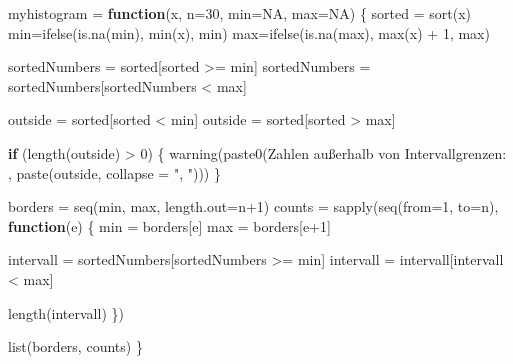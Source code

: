 \documentclass[
]{article}
\newenvironment{Shaded}{\begin{snugshade}}{\end{snugshade}}
\newcommand{\AttributeTok}[1]{\textcolor[rgb]{0.77,0.63,0.00}{#1}}
\newcommand{\ConstantTok}[1]{\textcolor[rgb]{0.00,0.00,0.00}{#1}}
\newcommand{\ControlFlowTok}[1]{\textcolor[rgb]{0.13,0.29,0.53}{\textbf{#1}}}
\newcommand{\DecValTok}[1]{\textcolor[rgb]{0.00,0.00,0.81}{#1}}
\newcommand{\FunctionTok}[1]{\textcolor[rgb]{0.00,0.00,0.00}{#1}}
\newcommand{\NormalTok}[1]{#1}
\newcommand{\OtherTok}[1]{\textcolor[rgb]{0.56,0.35,0.01}{#1}}
\newcommand{\SpecialCharTok}[1]{\textcolor[rgb]{0.00,0.00,0.00}{#1}}
\newcommand{\StringTok}[1]{\textcolor[rgb]{0.31,0.60,0.02}{#1}}
\begin{document}
\begin{Shaded}
\begin{Highlighting}[]
\NormalTok{myhistogram }\OtherTok{=} \ControlFlowTok{function}\NormalTok{(x, }\AttributeTok{n=}\DecValTok{30}\NormalTok{, }\AttributeTok{min=}\ConstantTok{NA}\NormalTok{, }\AttributeTok{max=}\ConstantTok{NA}\NormalTok{) \{}
\NormalTok{    sorted }\OtherTok{=} \FunctionTok{sort}\NormalTok{(x)}
\NormalTok{    min}\OtherTok{=}\FunctionTok{ifelse}\NormalTok{(}\FunctionTok{is.na}\NormalTok{(min), }\FunctionTok{min}\NormalTok{(x), min)}
\NormalTok{    max}\OtherTok{=}\FunctionTok{ifelse}\NormalTok{(}\FunctionTok{is.na}\NormalTok{(max), }\FunctionTok{max}\NormalTok{(x) }\SpecialCharTok{+} \DecValTok{1}\NormalTok{, max)}

\NormalTok{    sortedNumbers }\OtherTok{=}\NormalTok{ sorted[sorted }\SpecialCharTok{\textgreater{}=}\NormalTok{ min]}
\NormalTok{    sortedNumbers }\OtherTok{=}\NormalTok{ sortedNumbers[sortedNumbers }\SpecialCharTok{\textless{}}\NormalTok{ max]}

\NormalTok{    outside }\OtherTok{=}\NormalTok{ sorted[sorted }\SpecialCharTok{\textless{}}\NormalTok{ min]}
\NormalTok{    outside }\OtherTok{=}\NormalTok{ sorted[sorted }\SpecialCharTok{\textgreater{}}\NormalTok{ max]}

    \ControlFlowTok{if}\NormalTok{ (}\FunctionTok{length}\NormalTok{(outside) }\SpecialCharTok{\textgreater{}} \DecValTok{0}\NormalTok{) \{}
        \FunctionTok{warning}\NormalTok{(}\FunctionTok{paste0}\NormalTok{(}\StringTok{\textquotesingle{}Zahlen außerhalb von Intervallgrenzen: \textquotesingle{}}\NormalTok{, }\FunctionTok{paste}\NormalTok{(outside, }\AttributeTok{collapse =} \StringTok{", "}\NormalTok{)))}
\NormalTok{    \}}

\NormalTok{    borders }\OtherTok{=} \FunctionTok{seq}\NormalTok{(min, max, }\AttributeTok{length.out=}\NormalTok{n}\SpecialCharTok{+}\DecValTok{1}\NormalTok{)}
\NormalTok{    counts }\OtherTok{=} \FunctionTok{sapply}\NormalTok{(}\FunctionTok{seq}\NormalTok{(}\AttributeTok{from=}\DecValTok{1}\NormalTok{, }\AttributeTok{to=}\NormalTok{n), }\ControlFlowTok{function}\NormalTok{(e) \{}
\NormalTok{        min }\OtherTok{=}\NormalTok{ borders[e]}
\NormalTok{        max }\OtherTok{=}\NormalTok{ borders[e}\SpecialCharTok{+}\DecValTok{1}\NormalTok{]}

\NormalTok{        intervall }\OtherTok{=}\NormalTok{ sortedNumbers[sortedNumbers }\SpecialCharTok{\textgreater{}=}\NormalTok{ min]}
\NormalTok{        intervall }\OtherTok{=}\NormalTok{ intervall[intervall }\SpecialCharTok{\textless{}}\NormalTok{ max]}

        \FunctionTok{length}\NormalTok{(intervall)}
\NormalTok{    \})}

    \FunctionTok{list}\NormalTok{(borders, counts)}
\NormalTok{\}}
\end{Highlighting}
\end{Shaded}
\end{document}
